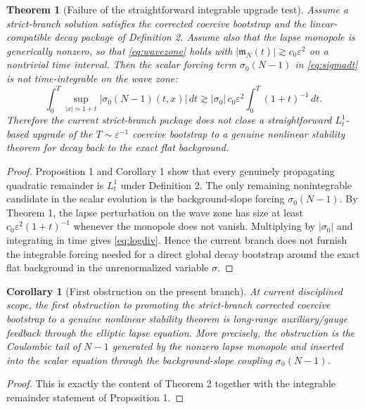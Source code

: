 \documentclass[11pt]{article}
\newtheorem{corollary}{Corollary}
\newtheorem{theorem}{Theorem}
\begin{document}
\begin{theorem}[Failure of the straightforward integrable upgrade test]
Assume a strict-branch solution satisfies the corrected coercive bootstrap and the linear-compatible decay package of Definition 2. Assume also that the lapse monopole is generically nonzero, so that \eqref{eq:wavezone} holds with \(|\mathfrak m_N(t)|\gtrsim c_0\varepsilon^2\) on a nontrivial time interval. Then the scalar forcing term \(\sigma_0(N-1)\) in \eqref{eq:sigmadt} is not time-integrable on the wave zone:
\begin{equation}
\int_0^T
\sup_{|x|\simeq 1+t}
|\sigma_0(N-1)(t,x)|\,dt
\gtrsim
|\sigma_0|\,c_0\varepsilon^2
\int_0^T (1+t)^{-1}\,dt.
\label{eq:logdiv}
\end{equation}
Therefore the current strict-branch package does \emph{not} close a straightforward \(L_t^1\)-based upgrade of the \(T\sim \varepsilon^{-1}\) coercive bootstrap to a genuine nonlinear stability theorem for decay back to the exact flat background.
\end{theorem}

\begin{proof}
Proposition 1 and Corollary 1 show that every genuinely propagating quadratic remainder is \(L_t^1\) under Definition 2. The only remaining nonintegrable candidate in the scalar evolution is the background-slope forcing \(\sigma_0(N-1)\). By Theorem 1, the lapse perturbation on the wave zone has size at least \(c_0\varepsilon^2(1+t)^{-1}\) whenever the monopole does not vanish. Multiplying by \(|\sigma_0|\) and integrating in time gives \eqref{eq:logdiv}. Hence the current branch does not furnish the integrable forcing needed for a direct global decay bootstrap around the exact flat background in the unrenormalized variable \(\sigma\).
\end{proof}

\begin{corollary}[First obstruction on the present branch]
At current disciplined scope, the first obstruction to promoting the strict-branch corrected coercive bootstrap to a genuine nonlinear stability theorem is long-range auxiliary/gauge feedback through the elliptic lapse equation. More precisely, the obstruction is the Coulombic tail of \(N-1\) generated by the nonzero lapse monopole and inserted into the scalar equation through the background-slope coupling \(\sigma_0(N-1)\).
\end{corollary}

\begin{proof}
This is exactly the content of Theorem 2 together with the integrable remainder statement of Proposition 1.
\end{proof}
\end{document}
